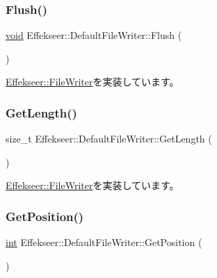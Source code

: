 \subsubsection{\texorpdfstring{Flush()}{Flush()}}
{\footnotesize\ttfamily \mbox{\hyperlink{namespace_effekseer_ab34c4088e512200cf4c2716f168deb56}{void}} Effekseer\+::\+Default\+File\+Writer\+::\+Flush (\begin{DoxyParamCaption}{ }\end{DoxyParamCaption})\hspace{0.3cm}{\ttfamily [virtual]}}



\mbox{\hyperlink{class_effekseer_1_1_file_writer_a319bba7ef4e98e98a5248accbee98df1}{Effekseer\+::\+File\+Writer}}を実装しています。

\mbox{\label{class_effekseer_1_1_default_file_writer_a6745621cb9db4dc7d33d89de8aae435e}} 
\subsubsection{\texorpdfstring{Get\+Length()}{GetLength()}}
{\footnotesize\ttfamily size\+\_\+t Effekseer\+::\+Default\+File\+Writer\+::\+Get\+Length (\begin{DoxyParamCaption}{ }\end{DoxyParamCaption})\hspace{0.3cm}{\ttfamily [virtual]}}



\mbox{\hyperlink{class_effekseer_1_1_file_writer_a6baf95dec7700d2c7a5e71c6c4f76724}{Effekseer\+::\+File\+Writer}}を実装しています。

\mbox{\label{class_effekseer_1_1_default_file_writer_aa85409b51ae30ea259ce2d0f0bd30656}} 
\subsubsection{\texorpdfstring{Get\+Position()}{GetPosition()}}
{\footnotesize\ttfamily \mbox{\hyperlink{namespace_effekseer_ace0abf7c2e6947e519ebe8b54cbcc30a}{int}} Effekseer\+::\+Default\+File\+Writer\+::\+Get\+Position (\begin{DoxyParamCaption}{ }\end{DoxyParamCaption})\hspace{0.3cm}{\ttfamily [virtual]}}



